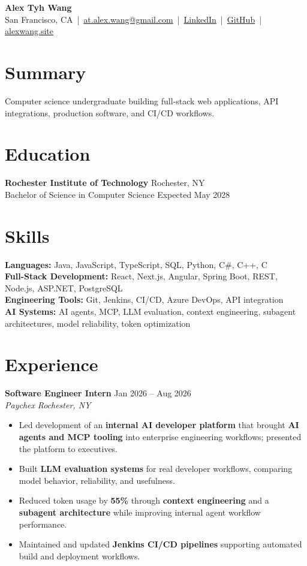 \documentclass[10pt,letterpaper]{article}
\newif\ifresumeFirstRole
\newcommand{\resumeRole}[4]{%
  \ifresumeFirstRole
    \global\resumeFirstRolefalse
  \else
    \vspace{0pt plus 1fill}%
  \fi
  \textbf{#1} \hfill #2\\
  \textit{#3} \hfill \textit{#4}
}
\begin{document}
\begin{center}
{\Large \textbf{Alex Tyh Wang}}\\
San Francisco, CA \,|\, \href{mailto:at.alex.wang@gmail.com}{at.alex.wang@gmail.com} \,|\, \href{https://www.linkedin.com/in/alex-tyh-wang/}{LinkedIn} \,|\, \href{https://github.com/alextyhwang}{GitHub} \,|\, \href{https://alexwang.site}{alexwang.site}
\end{center}

\section*{Summary}
Computer science undergraduate building full-stack web applications, API integrations, production software, and CI/CD workflows.

\section*{Education}
\textbf{Rochester Institute of Technology} \hfill Rochester, NY\\
Bachelor of Science in Computer Science \hfill Expected May 2028

\section*{Skills}
\textbf{Languages:} Java, JavaScript, TypeScript, SQL, Python, C\#, C++, C\\
\textbf{Full-Stack Development:} React, Next.js, Angular, Spring Boot, REST, Node.js, ASP.NET, PostgreSQL\\
\textbf{Engineering Tools:} Git, Jenkins, CI/CD, Azure DevOps, API integration\\
\textbf{AI Systems:} AI agents, MCP, LLM evaluation, context engineering, subagent architectures, model reliability, token optimization

\section*{Experience}
\resumeRole{Software Engineer Intern}{Jan 2026 -- Aug 2026}{Paychex}{Rochester, NY}
\begin{itemize}
  \item Led development of an \textbf{internal AI developer platform} that brought \textbf{AI agents and MCP tooling} into enterprise engineering workflows; presented the platform to executives.
  \item Built \textbf{LLM evaluation systems} for real developer workflows, comparing model behavior, reliability, and usefulness.
  \item Reduced token usage by \textbf{55\%} through \textbf{context engineering} and a \textbf{subagent architecture} while improving internal agent workflow performance.
  \item Maintained and updated \textbf{Jenkins CI/CD pipelines} supporting automated build and deployment workflows.
\end{itemize}
\end{document}
